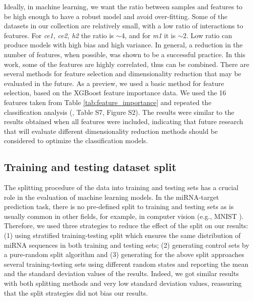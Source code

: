 \documentclass{bmcart}
\begin{document}
Ideally, in machine learning, we want the ratio between samples and features to be high enough to have a robust model and avoid over-fitting. Some of the datasets in our collection are relatively small, with a low ratio of interactions to features. For \textit{ce1, ce2, h2} the ratio is $\sim$4, and for \textit{m1} it is $\sim$2. Low ratio can produce models with high bias and high variance. In general, a reduction in the number of features, when possible, was shown to be a successful practice. In this work, some of the features are highly correlated, thus can be combined. There are several methods for feature selection and dimensionality reduction that may be evaluated in the future. As a preview, we used a basic method for feature selection, based on the XGBoost feature importance data. We used the 16 features taken from Table \ref{tab:feature_importance} and repeated the classification analysis (, Table S7, Figure S2). The results were similar to the results obtained when all features were included, indicating that future research that will evaluate different dimensionality reduction methods should be considered to optimize the classification models. 

\subsection*{Training and testing dataset split} 
The splitting procedure of the data into training and testing sets has a crucial role in the evaluation of machine learning models. In the miRNA-target prediction task, there is no pre-defined split to training and testing sets as is usually common in other fields, for example, in computer vision (e.g., MNIST \cite{mnist10027939599}). Therefore, we used three strategies to reduce the effect of the split on our results: (1) using stratified training-testing split which ensures the same distribution of miRNA sequences in both training and testing sets; (2) generating control sets by a pure-random split algorithm and (3) generating for the above split approaches several training-testing sets using different random states and reporting the mean and the standard deviation values of the results. Indeed, we got similar results with both splitting methods and very low standard deviation values, reassuring that the split strategies did not bias our results.
\end{document}
